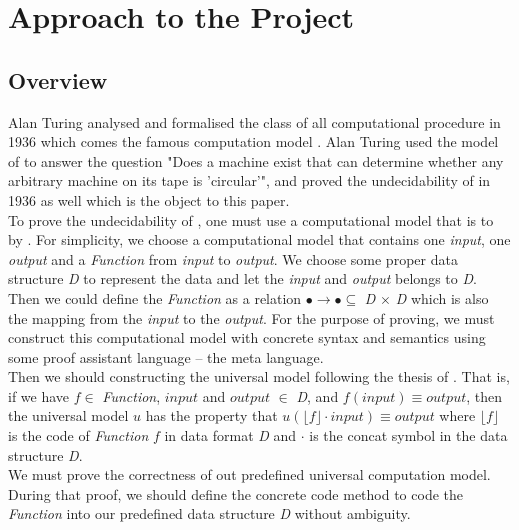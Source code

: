 \chapter{Approach to the Project}

\section{Overview}
Alan Turing analysed and formalised the class of all computational procedure in 1936\cite{turing_computable_1936} which comes the famous computation model .
Alan Turing used the model of  to answer the question "Does a machine exist that can determine whether any arbitrary machine on its tape is 'circular'", and proved the undecidability of  in 1936 as well\cite{turing_computable_1936} which is the object to this paper.\\
To prove the undecidability of , one must use a computational model that is  to  by \cite{copeland_church-turing_2002}.
For simplicity, we choose a computational model that contains one \textit{input}, one \textit{output} and a \textit{Function} from \textit{input} to \textit{output}.
We choose some proper data structure \textit{D} to represent the data and let the \textit{input} and \textit{output} belongs to \textit{D}.
Then we could define the \textit{Function} as a relation $\bullet \rightarrow \bullet \subseteq$ \textit{D} $\times$ \textit{D} which is also the mapping from the \textit{input} to the \textit{output}.
For the purpose of proving, we must construct this computational model with concrete syntax and semantics using some proof assistant language -- the meta language.\\
Then we should constructing the universal model following the thesis of \cite{copeland_church-turing_2002}.
That is, if we have $f \in$ \textit{Function}, $input$ and $output$ $\in$ \textit{D}, and $f(input) \equiv output$, then the universal model $u$ has the property that $u(\lfloor f\rfloor \cdot input) \equiv output$ where $\lfloor f\rfloor$ is the code of \textit{Function} $f$ in data format \textit{D} and $\cdot$ is the concat symbol in the data structure \textit{D}.\\
We must prove the correctness of out predefined universal computation model.
During that proof, we should define the concrete code method to code the \textit{Function} into our predefined data structure \textit{D} without ambiguity.
